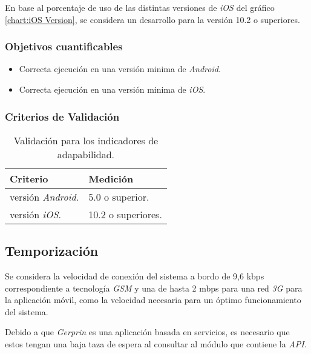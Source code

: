 En base al porcentaje de uso de las distintas versiones de \textit{iOS} del gráfico \ref{chart:iOS Version}, se considera un desarrollo para la versión 10.2 o superiores.

\subsubsection{Objetivos cuantificables}

\begin{itemize}
	\item
	Correcta ejecución en una versión minima de \textit{Android}.
	\item
	Correcta ejecución en una versión minima de \textit{iOS}.
\end{itemize}

\subsubsection{Criterios de Validación}

\begin{table}[H]
    \caption[Validación para los indicadores de adapabilidad.] {Validación para los indicadores de adapabilidad.}
    \label{tbl:Criterios de Validación Adapabilidad}
    \begin{tabular}{|p{}|p{}|}
        \hline
        \textbf{Criterio} &  \textbf{Medición}\\
    	\hline
    	\hline
    	versión \textit{Android}. & 5.0 o superior. \\ \hline
		versión \textit{iOS}.  & 10.2 o superiores. \\ 
        \hline
    \end{tabular}
\end{table}

\subsection{Temporización}

Se considera la velocidad de conexión del sistema a bordo de 9,6 kbps correspondiente a tecnología \textit{GSM} y una de hasta 2 mbps para una red \textit{3G} para la aplicación móvil, como la velocidad necesaria para un óptimo funcionamiento del sistema.

Debido a que \textit{Gerprin} es una aplicación basada en servicios, es necesario que estos tengan una baja taza de espera al consultar al módulo que contiene la \textit{API}.

